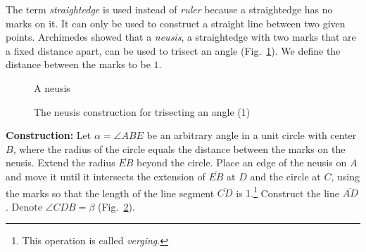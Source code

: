 The term \emph{straightedge} is used instead of \emph{ruler} because a straightedge has no marks on it. It can only be used to construct a straight line between two given points. Archimedes showed that a \emph{neusis}, a straightedge with two marks that are a fixed distance apart, can be used to trisect an angle (Fig.~\ref{f.neusis}). We define the distance between the marks to be $1$.

\begin{figure}[h]
\begin{center}
\end{center}
\caption{A neusis}\label{f.neusis}
\end{figure}

\newpage

\begin{figure}[tbh]
\begin{center}
\end{center}
\caption{The neusis construction for trisecting an angle (1)}\label{f.trisect-neusis-1}
\end{figure}
\noindent\textbf{Construction:}
Let $\alpha=\angle ABE$ be an arbitrary angle in a unit circle with center $B$, where the radius of the circle equals the distance between the marks on the neusis. Extend the radius $\overline{EB}$ beyond the circle. Place an edge of the neusis on $A$ and move it until it intersects the extension of $\overline{EB}$ at $D$ and the circle at $C$, using the marks so that the length of the line segment $\overline{CD}$ is $1$.\footnote{This operation is called \emph{verging}.} Construct the line $\overline{AD}$. Denote $\angle CDB=\beta$ (Fig.~\ref{f.trisect-neusis-1}).

